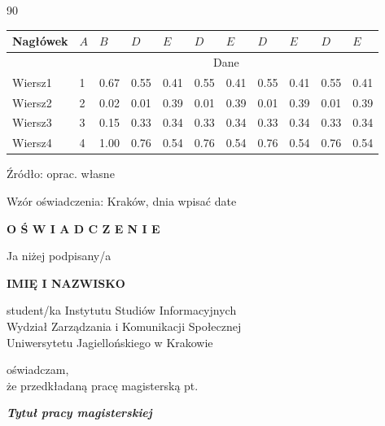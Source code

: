 \documentclass[twoside,a4paper,12pt]{report} %
\theoremstyle{break}
\begin{document}
\newpage
\begin{table}[ht]
   \begin{turn}{90}
  \begin{threeparttable}
     \begin{tabular}{lllllllllll}
        \toprule
        Nagłówek & \( A \) & \( B \) & \( D \) & \( E \)  & \( D \) & \( E \) & \( D \) & \( E \) & \( D \) & \( E \)\\
        \midrule
                 &  \multicolumn{10}{c}{Dane}     \\
        Wiersz1    & 1        & 0.67    & 0.55       & 0.41       & 0.55       & 0.41       & 0.55       & 0.41       & 0.55       & 0.41    \\
        Wiersz2    & 2        & 0.02    & 0.01       & 0.39        & 0.01       & 0.39        & 0.01       & 0.39        & 0.01       & 0.39    \\
        Wiersz3    & 3        & 0.15    & 0.33       & 0.34        & 0.33       & 0.34        & 0.33       & 0.34        & 0.33       & 0.34    \\
        Wiersz4    & 4        & 1.00    & 0.76       & 0.54        & 0.76       & 0.54        & 0.76       & 0.54        & 0.76       & 0.54    \\
        \bottomrule
     \end{tabular}
    \begin{tablenotes}
      \small
      \item Źródło: oprac. własne
    \end{tablenotes}
  \end{threeparttable}
  \end{turn}
\end{table}
\newpage\thispagestyle{empty}
\newpage\thispagestyle{empty}
Wzór oświadczenia: \hfill Kraków, dnia wpisać date\par\vspace{1cm}\par
\centerline{{\Large \bf O Ś W I A D C Z E N I E}}
\par\vspace{1.4cm}\par
Ja niżej podpisany/a
\begin{center}
{\sc \bf IMIĘ I NAZWISKO}
\end{center}
\begin{center}
{\large student/ka Instytutu Studiów Informacyjnych\\
Wydział Zarządzania i Komunikacji Społecznej\\
Uniwersytetu Jagiellońskiego w Krakowie
}\par\vspace{0.6cm}\par
oświadczam,\\

że przedkładaną pracę magisterską pt.

\end{center}
\par
\begin{center}
{\sc \sl \large \bf Tytuł pracy magisterskiej}
\end{center}
\end{document}
